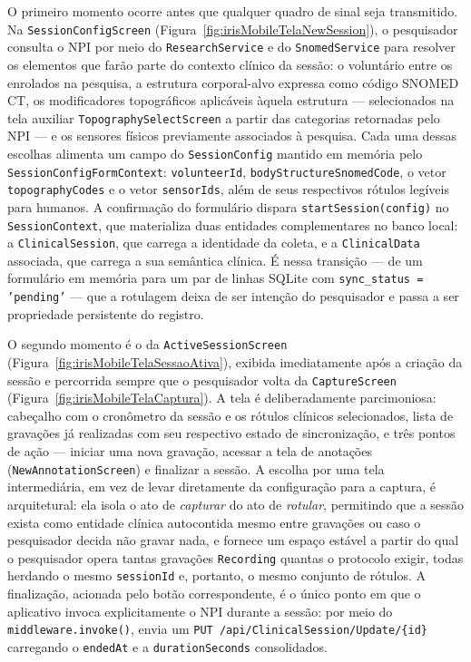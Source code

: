 O primeiro momento ocorre antes que qualquer quadro de sinal seja transmitido. Na \texttt{SessionConfigScreen} (Figura~\ref{fig:irisMobileTelaNewSession}), o pesquisador consulta o NPI por meio do \texttt{ResearchService} e do \texttt{SnomedService} para resolver os elementos que farão parte do contexto clínico da sessão: o voluntário entre os enrolados na pesquisa, a estrutura corporal-alvo expressa como código SNOMED CT, os modificadores topográficos aplicáveis àquela estrutura --- selecionados na tela auxiliar \texttt{TopographySelectScreen} a partir das categorias retornadas pelo NPI --- e os sensores físicos previamente associados à pesquisa. Cada uma dessas escolhas alimenta um campo do \texttt{SessionConfig} mantido em memória pelo \texttt{SessionConfigFormContext}: \texttt{volunteerId}, \texttt{bodyStructureSnomedCode}, o vetor \texttt{topographyCodes} e o vetor \texttt{sensorIds}, além de seus respectivos rótulos legíveis para humanos. A confirmação do formulário dispara \texttt{startSession(config)} no \texttt{SessionContext}, que materializa duas entidades complementares no banco local: a \texttt{ClinicalSession}, que carrega a identidade da coleta, e a \texttt{ClinicalData} associada, que carrega a sua semântica clínica. É nessa transição --- de um formulário em memória para um par de linhas SQLite com \texttt{sync\_status = 'pending'} --- que a rotulagem deixa de ser intenção do pesquisador e passa a ser propriedade persistente do registro.

O segundo momento é o da \texttt{ActiveSessionScreen} (Figura~\ref{fig:irisMobileTelaSessaoAtiva}), exibida imediatamente após a criação da sessão e percorrida sempre que o pesquisador volta da \texttt{CaptureScreen} (Figura~\ref{fig:irisMobileTelaCaptura}). A tela é deliberadamente parcimoniosa: cabeçalho com o cronômetro da sessão e os rótulos clínicos selecionados, lista de gravações já realizadas com seu respectivo estado de sincronização, e três pontos de ação --- iniciar uma nova gravação, acessar a tela de anotações (\texttt{NewAnnotationScreen}) e finalizar a sessão. A escolha por uma tela intermediária, em vez de levar diretamente da configuração para a captura, é arquitetural: ela isola o ato de \textit{capturar} do ato de \textit{rotular}, permitindo que a sessão exista como entidade clínica autocontida mesmo entre gravações ou caso o pesquisador decida não gravar nada, e fornece um espaço estável a partir do qual o pesquisador opera tantas gravações \texttt{Recording} quantas o protocolo exigir, todas herdando o mesmo \texttt{sessionId} e, portanto, o mesmo conjunto de rótulos. A finalização, acionada pelo botão correspondente, é o único ponto em que o aplicativo invoca explicitamente o NPI durante a sessão: por meio do \texttt{middleware.invoke()}, envia um \texttt{PUT /api/ClinicalSession/Update/\{id\}} carregando o \texttt{endedAt} e a \texttt{durationSeconds} consolidados.

